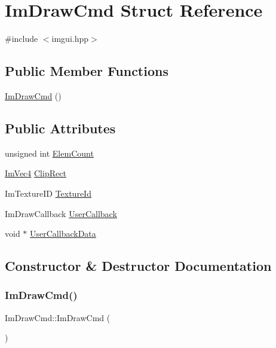 \hypertarget{struct_im_draw_cmd}{}\section{Im\+Draw\+Cmd Struct Reference}
\label{struct_im_draw_cmd}


{\ttfamily \#include $<$imgui.\+hpp$>$}

\subsection*{Public Member Functions}
\begin{DoxyCompactItemize}
\item 
\hyperlink{struct_im_draw_cmd_adcf30cacb8e6b747e90000603c87f1e3}{Im\+Draw\+Cmd} ()
\end{DoxyCompactItemize}
\subsection*{Public Attributes}
\begin{DoxyCompactItemize}
\item 
unsigned int \hyperlink{struct_im_draw_cmd_aafe2532964fb1f6905d67d84dd3e8730}{Elem\+Count}
\item 
\hyperlink{struct_im_vec4}{Im\+Vec4} \hyperlink{struct_im_draw_cmd_a838918f420ff81cb8dc7265077592daa}{Clip\+Rect}
\item 
Im\+Texture\+ID \hyperlink{struct_im_draw_cmd_a4f3b5985ece9ca6b71e7a8e7d85a82e5}{Texture\+Id}
\item 
Im\+Draw\+Callback \hyperlink{struct_im_draw_cmd_ad26dac4e939f5c4bb892cbca0f9e3af8}{User\+Callback}
\item 
void $\ast$ \hyperlink{struct_im_draw_cmd_ae2f5a0baf4a0b25942237b8ce6adb42d}{User\+Callback\+Data}
\end{DoxyCompactItemize}


\subsection{Constructor \& Destructor Documentation}
\hypertarget{struct_im_draw_cmd_adcf30cacb8e6b747e90000603c87f1e3}{}\label{struct_im_draw_cmd_adcf30cacb8e6b747e90000603c87f1e3} 
\subsubsection{\texorpdfstring{Im\+Draw\+Cmd()}{ImDrawCmd()}}
{\footnotesize\ttfamily Im\+Draw\+Cmd\+::\+Im\+Draw\+Cmd (\begin{DoxyParamCaption}{ }\end{DoxyParamCaption})}



